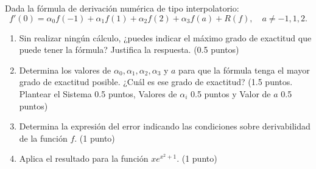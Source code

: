 \documentclass[12pt]{article}
\begin{document}
    \begin{ejercicio}[4 puntos]
      Dada la fórmula de derivación numérica de tipo interpolatorio:
      \[
      f'(0) = \alpha_0 f(-1) + \alpha_1 f(1) + \alpha_2 f(2) + \alpha_3 f(a) + R(f), \quad a \neq -1, 1, 2.
      \]

      \begin{enumerate}
        \item Sin realizar ningún cálculo, ¿puedes indicar el máximo grado de exactitud que puede tener la fórmula? Justifica la respuesta. (0.5 puntos)
        \item Determina los valores de \( \alpha_0, \alpha_1, \alpha_2, \alpha_3 \) y \( a \) para que la fórmula tenga el mayor grado de exactitud posible. ¿Cuál es ese grado de exactitud? (1.5 puntos. Plantear el Sistema 0.5 puntos, 
        Valores de $\alpha_i$ 0.5 puntos y Valor de $a$ 0.5 puntos)
        \item Determina la expresión del error indicando las condiciones sobre derivabilidad de la función \( f \). (1 punto)  
        \item Aplica el resultado para la función $xe^{x^2 + 1}$. (1 punto) 
      \end{enumerate}
    \end{ejercicio}

    \newpage

    \setcounter{ejercicio}{0}
\end{document}
